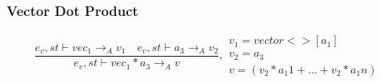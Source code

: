 \subsubsection{Vector Dot Product}
\begin{equation}
	\frac { { e }_{ v },st\vdash { vec }_{ 1 }{ \rightarrow  }_{ A }{ v }_{ 1 }\quad { e }_{ v },st\vdash { a }_{ 3 }{ \rightarrow  }_{ A }{ v }_{ 2 } }{ { e }_{ v },st\vdash { vec }_{ 1 }\ast { a }_{ 3 }{ \rightarrow  }_{ A }{ v } } ,\begin{matrix} { v }_{ 1 }=vector<>[{ a }_{ 1 }] \\ { v }_{ 2 }={ a }_{ 3 } \\ v=({ v }_{ 2 }*{ a }_{ 1 }1+...+{ v }_{ 2 }*{ a }_{ 1 }n) \end{matrix}
\end{equation}